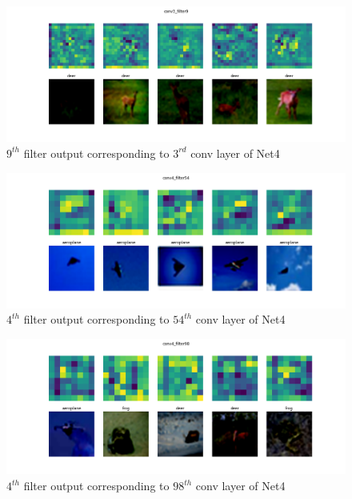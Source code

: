 \documentclass{article}
\begin{document}
\begin{figure}[ht]
	\centering
	\includegraphics[scale=0.4]{../code/images/Filter_conv3_filter9.png}
	\caption{$9^{th}$ filter output corresponding to $3^{rd}$ conv layer of Net4}
	\label{fig:c3f9}
\end{figure}

\begin{figure}[ht]
	\centering
	\includegraphics[scale=0.4]{../code/images/Filter_conv4_filter54.png}
	\caption{$4^{th}$ filter output corresponding to $54^{th}$ conv layer of Net4}
	\label{fig:c4f54}
\end{figure}

\begin{figure}[ht]
	\centering
	\includegraphics[scale=0.4]{../code/images/Filter_conv4_filter98.png}
	\caption{$4^{th}$ filter output corresponding to $98^{th}$ conv layer of Net4}
	\label{fig:c4f98}
\end{figure}
\end{document}
